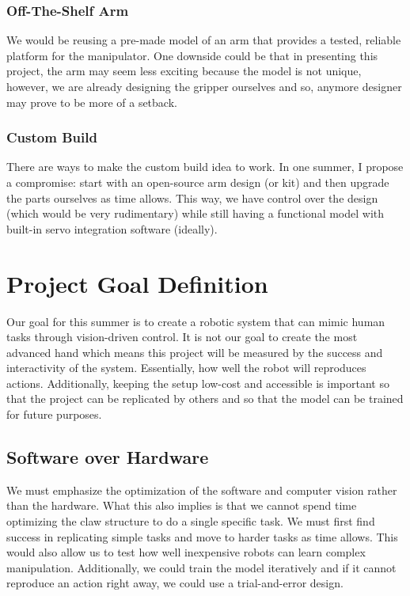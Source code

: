 \documentclass[document]{llncs}
\begin{document}
\subsubsection{Off-The-Shelf Arm}
We would be reusing a pre-made model of an arm that provides a tested, reliable platform for the manipulator. One downside could be that in presenting this project, the arm may seem less exciting because the model is not unique, however, we are already designing the gripper ourselves and so, anymore designer may prove to be more of a setback. 

\subsubsection{Custom Build}
There are ways to make the custom build idea to work. In one summer, I propose a compromise: start with an open-source arm design (or kit) and then upgrade the parts ourselves as time allows. This way, we have control over the design (which would be very rudimentary) while still having a functional model with built-in servo integration software (ideally). 

\section{Project Goal Definition}
Our goal for this summer is to create a robotic system that can mimic human tasks through vision-driven control. It is not our goal to create the most advanced hand which means this project will be measured by the success and interactivity of the system. Essentially, how well the robot will reproduces actions. Additionally, keeping the setup low-cost and accessible is important so that the project can be replicated by others and so that the model can be trained for future purposes. 

\subsection{Software over Hardware}
We must emphasize the optimization of the software and computer vision rather than the hardware. What this also implies is that we cannot spend time optimizing the claw structure to do a single specific task. We must first find success in replicating simple tasks and move to harder tasks as time allows. This would also allow us to test how well inexpensive robots can learn complex manipulation. Additionally, we could train the model iteratively and if it cannot reproduce an action right away, we could use a trial-and-error design.
\end{document}

